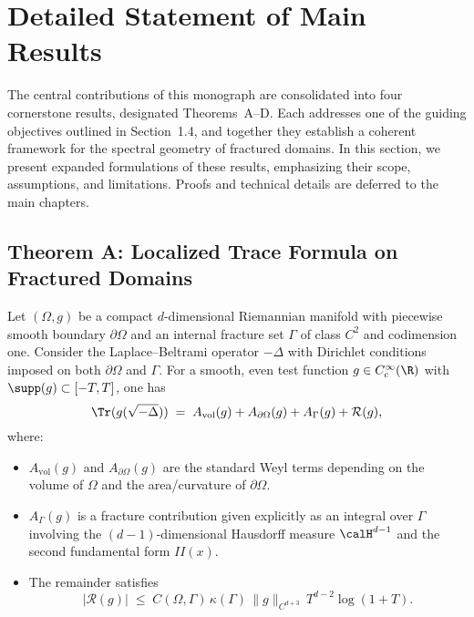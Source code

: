 \section{Detailed Statement of Main Results}

The central contributions of this monograph are consolidated into four
cornerstone results, designated Theorems~A–D. Each addresses one of the
guiding objectives outlined in Section~1.4, and together they establish
a coherent framework for the spectral geometry of fractured domains.
In this section, we present expanded formulations of these results,
emphasizing their scope, assumptions, and limitations. Proofs and
technical details are deferred to the main chapters.

\subsection*{Theorem A: Localized Trace Formula on Fractured Domains}
\begin{theorem}\label{thm:trace}
Let $(\Omega,g)$ be a compact $d$-dimensional Riemannian manifold with
piecewise smooth boundary $\partial\Omega$ and an internal fracture set
$\Gamma$ of class $C^2$ and codimension one. Consider the Laplace–Beltrami
operator $-\Delta$ with Dirichlet conditions imposed on both
$\partial\Omega$ and $\Gamma$. For a smooth, even test function
$g \in C_c^\infty(\R)$ with $\supp(g) \subset [-T,T]$, one has
\[
    \Tr(g(\sqrt{-\Delta}))
    \;=\; A_{\mathrm{vol}}(g)
        + A_{\partial\Omega}(g)
        + A_\Gamma(g)
        + \mathcal{R}(g),
\]
where:
\begin{itemize}
  \item $A_{\mathrm{vol}}(g)$ and $A_{\partial\Omega}(g)$ are the standard
  Weyl terms depending on the volume of $\Omega$ and the area/curvature
  of $\partial\Omega$.
  \item $A_\Gamma(g)$ is a fracture contribution given explicitly as
  an integral over $\Gamma$ involving the $(d-1)$-dimensional Hausdorff
  measure $\calH^{d-1}$ and the second fundamental form $II(x)$.
  \item The remainder satisfies
  \[
      |\mathcal{R}(g)|
      \;\leq\;
      C(\Omega,\Gamma)\,\kappa(\Gamma)\,
      \|g\|_{C^{d+3}}\,
      T^{d-2}\log(1+T).
  \]
\end{itemize}
\end{theorem}

